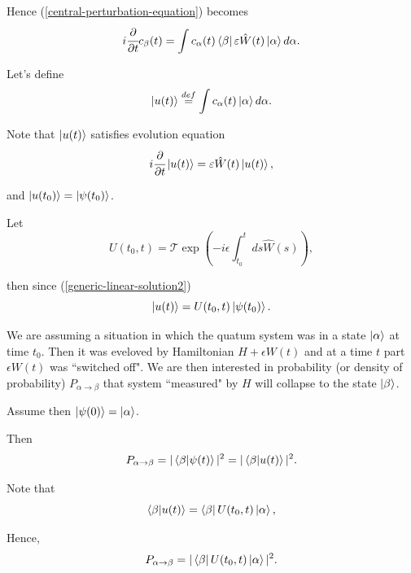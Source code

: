 \documentclass[main.tex]{subfiles}
\begin{document}
Hence (\ref{central-perturbation-equation}) becomes
\begin{equation}
i\cfrac{\partial}{\partial t} c_\beta(t) = \int c_\alpha(t)\bra{\beta}\varepsilon \hat{W}(t) \ket{\alpha}d\alpha.
\end{equation}

Let's define
\begin{equation}
\ket{u(t)} \stackrel{def}{=}  \int c_\alpha (t) \ket{\alpha} d\alpha.
\end{equation}

Note that $\ket{u(t)}$ satisfies evolution equation
\begin{equation}
i\cfrac{\partial}{\partial t} \ket{u(t)} = \varepsilon \hat{W}(t) \ket{u(t)},
\end{equation}

and $\ket{u(t_0)} = \ket{\psi(t_0)}$.

Let 
\begin{equation}
U(t_0, t) = \mathcal{T} \exp(-i\epsilon \int_{t_0}^t ds \hat{W}(s)),
\end{equation}

then since (\ref{generic-linear-solution2})
\begin{equation}
\ket{u(t)} = U(t_0, t) \ket{\psi(t_0)}.
\end{equation}

We are assuming a situation in which the quatum system was in a state $\ket{\alpha}$ at time $t_0$. Then it was eveloved by Hamiltonian $H + \epsilon W(t)$ and at a time $t$ part $\epsilon W(t)$ was ``switched off". We are then interested in probability (or density of probability) $P_{\alpha \to \beta}$ that system ``measured" by $H$ will collapse to the state $\ket{\beta}$.

Assume then $\ket{\psi(0)} = \ket{\alpha}$.

Then
\begin{equation}
P_{\alpha \to \beta} = |\bra{\beta}\ket{\psi(t)}|^2 = |\bra{\beta}\ket{u(t)}|^2.
\end{equation}

Note that
\begin{equation}
\bra{\beta}\ket{u(t)} = \bra{\beta} U(t_0, t) \ket{\alpha},
\end{equation}

Hence,
\begin{equation}
P_{\alpha \to \beta} = |\bra{\beta} U(t_0, t) \ket{\alpha}|^2.
\end{equation}
\end{document}
